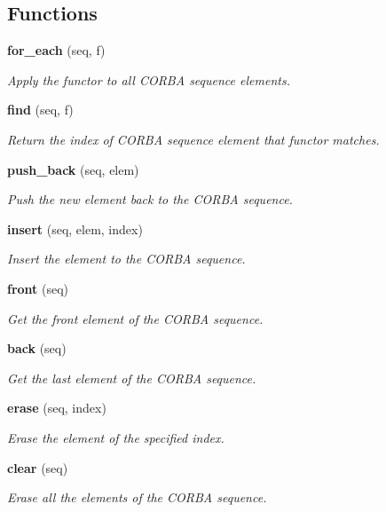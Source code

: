 \subsection*{Functions}
\begin{CompactItemize}
\item 
{\bf for\_\-each} (seq, f)
\begin{CompactList}\small\item\em Apply the functor to all CORBA sequence elements. \item\end{CompactList}\item 
{\bf find} (seq, f)
\begin{CompactList}\small\item\em Return the index of CORBA sequence element that functor matches. \item\end{CompactList}\item 
{\bf push\_\-back} (seq, elem)
\begin{CompactList}\small\item\em Push the new element back to the CORBA sequence. \item\end{CompactList}\item 
{\bf insert} (seq, elem, index)
\begin{CompactList}\small\item\em Insert the element to the CORBA sequence. \item\end{CompactList}\item 
{\bf front} (seq)
\begin{CompactList}\small\item\em Get the front element of the CORBA sequence. \item\end{CompactList}\item 
{\bf back} (seq)
\begin{CompactList}\small\item\em Get the last element of the CORBA sequence. \item\end{CompactList}\item 
{\bf erase} (seq, index)
\begin{CompactList}\small\item\em Erase the element of the specified index. \item\end{CompactList}\item 
{\bf clear} (seq)
\begin{CompactList}\small\item\em Erase all the elements of the CORBA sequence. \item\end{CompactList}\end{CompactItemize}


